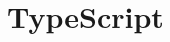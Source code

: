 \documentclass[oneside]{book}
\begin{document}
%  
%  

% 
% 
% 
% 
% 
% 
% 
%  
% 
% 
% 
%  
%  
%  
%  
%  
% 
% 
% 
% 
% 
% 
% 
% 
% 
% 
\chapter{TypeScript}
\end{document}
